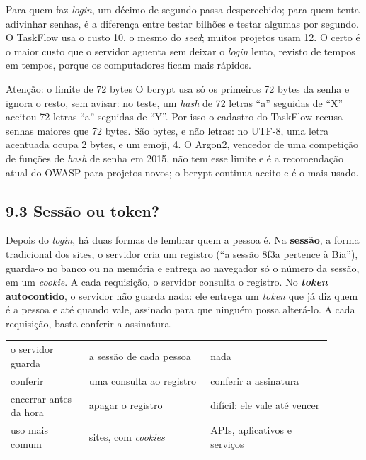 Para quem faz \textit{login}, um décimo de segundo passa despercebido; para quem tenta adivinhar senhas, é a diferença entre testar bilhões e testar algumas por segundo. O TaskFlow usa o custo 10, o mesmo do \textit{seed}; muitos projetos usam 12. O certo é o maior custo que o servidor aguenta sem deixar o \textit{login} lento, revisto de tempos em tempos, porque os computadores ficam mais rápidos.

\begin{destaque}{Atenção: o limite de 72 bytes}
O bcrypt usa só os primeiros 72 bytes da senha e ignora o resto, sem avisar: no teste, um \textit{hash} de 72 letras ``a'' seguidas de ``X'' aceitou 72 letras ``a'' seguidas de ``Y''. Por isso o cadastro do TaskFlow recusa senhas maiores que 72 bytes. São bytes, e não letras: no UTF-8, uma letra acentuada ocupa 2 bytes, e um emoji, 4. O Argon2, vencedor de uma competição de funções de \textit{hash} de senha em 2015, não tem esse limite e é a recomendação atual do OWASP para projetos novos; o bcrypt continua aceito e é o mais usado.
\end{destaque}

\subsection{9.3 Sessão ou token?}

Depois do \textit{login}, há duas formas de lembrar quem a pessoa é. Na \textbf{sessão}, a forma tradicional dos sites, o servidor cria um registro (``a sessão 8f3a pertence à Bia''), guarda-o no banco ou na memória e entrega ao navegador só o número da sessão, em um \textit{cookie}. A cada requisição, o servidor consulta o registro. No \textbf{\textit{token} autocontido}, o servidor não guarda nada: ele entrega um \textit{token} que já diz quem é a pessoa e até quando vale, assinado para que ninguém possa alterá-lo. A cada requisição, basta conferir a assinatura.

\begin{center}
\begin{tabular}{@{}P{0.22\linewidth}P{0.34\linewidth}P{0.34\linewidth}@{}}
\toprule
{}
\tblheader{} &  &  \\
\midrule
o servidor guarda & a sessão de cada pessoa & nada \\
 conferir & uma consulta ao registro & conferir a assinatura \\
encerrar antes da hora & apagar o registro & difícil: ele vale até vencer \\
 uso mais comum & sites, com \textit{cookies} & APIs, aplicativos e serviços \\
\bottomrule
\end{tabular}
\end{center}

